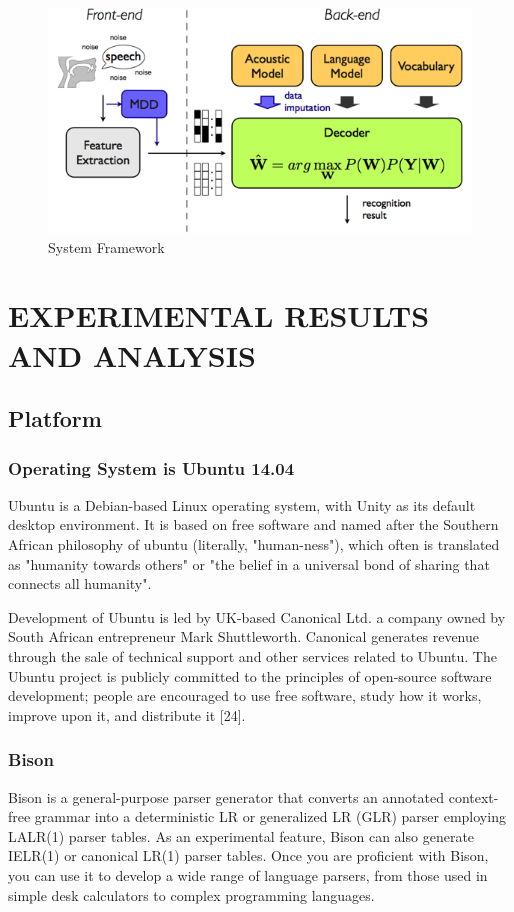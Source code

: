 \documentclass[12pt,a4paper,oneside]{memoir}
\begin{document}
\begin{figure}[h]
    \centering
    \includegraphics[scale=0.5]{mdt_recognizer}
    \caption{System Framework}
\end{figure}

\chapter{EXPERIMENTAL RESULTS AND ANALYSIS}
\section{Platform}
\subsection{Operating System is Ubuntu 14.04}
Ubuntu is a Debian-based Linux operating system, with Unity as its default desktop environment. It is based on free software and named after the Southern African philosophy of ubuntu (literally, "human-ness"), which often is translated as "humanity towards others" or "the belief in a universal bond of sharing that connects all humanity".

Development of Ubuntu is led by UK-based Canonical Ltd. a company owned by South African entrepreneur Mark Shuttleworth. Canonical generates revenue through the sale of technical support and other services related to Ubuntu. The Ubuntu project is publicly committed to the principles of open-source software development; people are encouraged to use free software, study how it works, improve upon it, and distribute it [24].
\subsection{Bison}
Bison is a general-purpose parser generator that converts an annotated context-free grammar into a deterministic LR or generalized LR (GLR) parser employing LALR(1) parser tables. As an experimental feature, Bison can also generate IELR(1) or canonical LR(1) parser tables. Once you are proficient with Bison, you can use it to develop a wide range of language parsers, from those used in simple desk calculators to complex programming languages.
\end{document}
